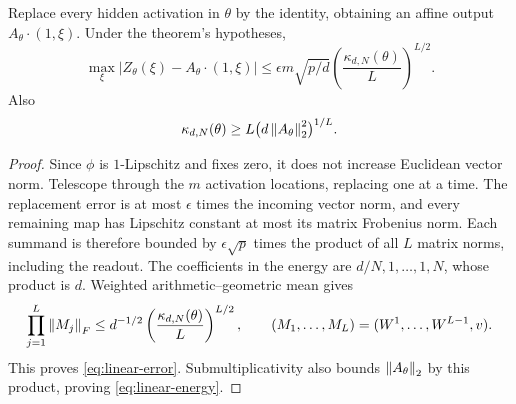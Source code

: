 \begin{lemma}
\label{lem:linearize}
Replace every hidden activation in $\theta$ by the identity, obtaining
an affine output $A_\theta\cdot(1,\xi)$. Under the theorem's hypotheses,
\begin{equation}\label{eq:linear-error}
 \max_\xi|Z_\theta(\xi)-A_\theta\cdot(1,\xi)|
 \le\epsilon m\sqrt{p/d}\left(\frac{\kappa_{d,N}(\theta)}L\right)^{L/2}.
\end{equation}
Also
\begin{equation}\label{eq:linear-energy}
 \kappa_{d,N}(\theta)\ge
       L\bigl(d\left\lVert A_\theta\right\rVert_2^2\bigr)^{1/L}.
\end{equation}
\end{lemma}
\begin{proof}
Since $\phi$ is $1$-Lipschitz and fixes zero, it does not increase
Euclidean vector norm. Telescope through the $m$ activation locations,
replacing one at a time. The replacement error is at most $\epsilon$
times the incoming vector norm, and every remaining map has Lipschitz
constant at most its matrix Frobenius norm. Each summand is therefore
bounded by $\epsilon\sqrt p$ times the product of all $L$ matrix norms,
including the readout. The coefficients in the energy are
$d/N,1,\ldots,1,N$, whose product is $d$. Weighted
arithmetic--geometric mean gives
\[
 \prod_{j=1}^L\left\lVert M_j\right\rVert_F
 \le d^{-1/2}\left(\frac{\kappa_{d,N}(\theta)}L\right)^{L/2},
 \qquad (M_1,\ldots,M_L)=(W^1,\ldots,W^{L-1},v).
\]
This proves \eqref{eq:linear-error}. Submultiplicativity also bounds
$\left\lVert A_\theta\right\rVert_2$ by this product, proving \eqref{eq:linear-energy}.
\end{proof}

